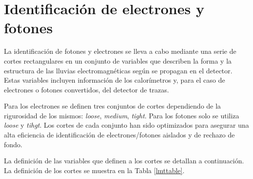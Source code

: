 \section{Identificación de electrones y fotones}

La identificación de fotones y electrones se lleva a cabo mediante una serie de cortes rectangulares en un conjunto de variables que describen la forma y la estructura de las lluvias electromagnéticas según se propagan en el detector. Estas variables incluyen información de los calorímetros y, para el caso de electrones o fotones convertidos, del detector de trazas.

Para los electrones se definen tres conjuntos de cortes dependiendo de la rigurosidad de los mismos: \textit{loose}, \textit{medium}, \textit{tight}. Para los fotones solo se utiliza \textit{loose} y \textit{tihgt}. Los cortes de cada conjunto han sido optimizados para asegurar una alta eficiencia de identificación de electrones/fotones aislados y de rechazo de fondo.

La definición de las variables que definen a los cortes se detallan a continuación. La definición de los cortes se muestra en la Tabla \ref{lmttable}.


